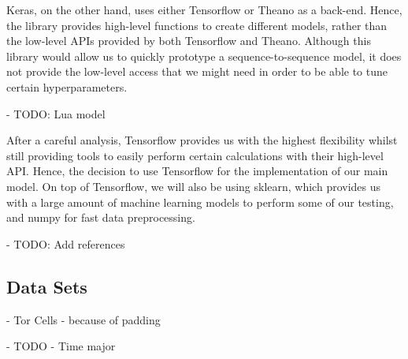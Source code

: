 Keras, on the other hand, uses either Tensorflow or Theano as a back-end.
Hence, the library provides high-level functions to create different models, rather than the low-level APIs provided by both Tensorflow and Theano.
Although this library would allow us to quickly prototype a sequence-to-sequence model, it does not provide the low-level access that we might need in order to be able to tune certain hyperparameters.

- TODO: Lua model

After a careful analysis, Tensorflow provides us with the highest flexibility whilst still providing tools to easily perform certain calculations with their high-level API.
Hence, the decision to use Tensorflow for the implementation of our main model.
On top of Tensorflow, we will also be using sklearn, which provides us with a large amount of machine learning models to perform some of our testing, and numpy for fast data preprocessing.

- TODO: Add references

\subsection{Data Sets}


- Tor Cells - because of padding

- TODO - Time major

